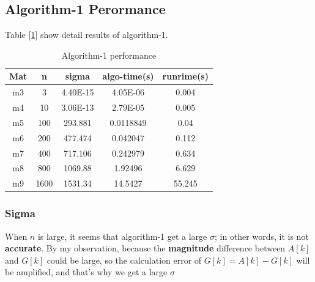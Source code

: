 \documentclass{article}
\begin{document}
\subsection{Algorithm-1 Perormance}
Table [\ref{tab:algo1}] show detail results of algorithm-1.
\begin{table}[h!]
    \centering
    \caption{Algorithm-1 performance}
    \begin{tabular}{|c|c|c|c|c|}
        \hline
        Mat & n   & sigma & algo-time(s) & runrime(s) \bigstrut\\
        \hline
        m3  & 3   & 4.40E-15 & 4.05E-06 & 0.004 \bigstrut\\
        \hline
        m4  & 10  & 3.06E-13 & 2.79E-05 & 0.005 \bigstrut\\
        \hline
        m5  & 100 & 293.881 & 0.0118849 & 0.04 \bigstrut\\
        \hline
        m6  & 200 & 477.474 & 0.042047 & 0.112 \bigstrut\\
        \hline
        m7  & 400 & 717.106 & 0.242979 & 0.634 \bigstrut\\
        \hline
        m8  & 800 & 1069.88 & 1.92496 & 6.629 \bigstrut\\
        \hline
        m9  & 1600 & 1531.34 & 14.5427 & 55.245 \bigstrut\\
        \hline
    \end{tabular}%

    \label{tab:algo1}
\end{table}%
\subsubsection{Sigma}
\label{sec:algo1-sigma}
When $n$ is large, it seems that algorithm-1 get a large $\sigma$; in other words, it is not \textbf{accurate}. By my observation,
because the \textbf{magnitude} difference between $A[k]$ and $G[k]$ could be large, so the calculation error of $G[k] = A[k] - G[k]$
will be amplified, and that's why we get a large {\boldmath$\sigma$}
\newpage
\end{document}
